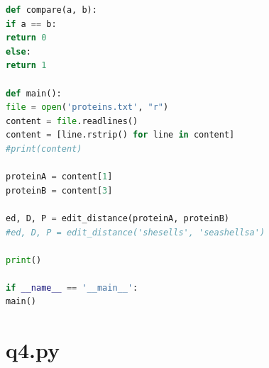 \documentclass{article}
\begin{document}
\begin{lstlisting}[language = python]
def compare(a, b):
if a == b:
return 0
else:
return 1

def main():
file = open('proteins.txt', "r")
content = file.readlines()
content = [line.rstrip() for line in content]
#print(content)

proteinA = content[1]
proteinB = content[3]

ed, D, P = edit_distance(proteinA, proteinB)
#ed, D, P = edit_distance('shesells', 'seashellsa')

print()

if __name__ == '__main__':
main()
	\end{lstlisting}

	\section{q4.py}
	\label{ap:q4}
\end{document}
